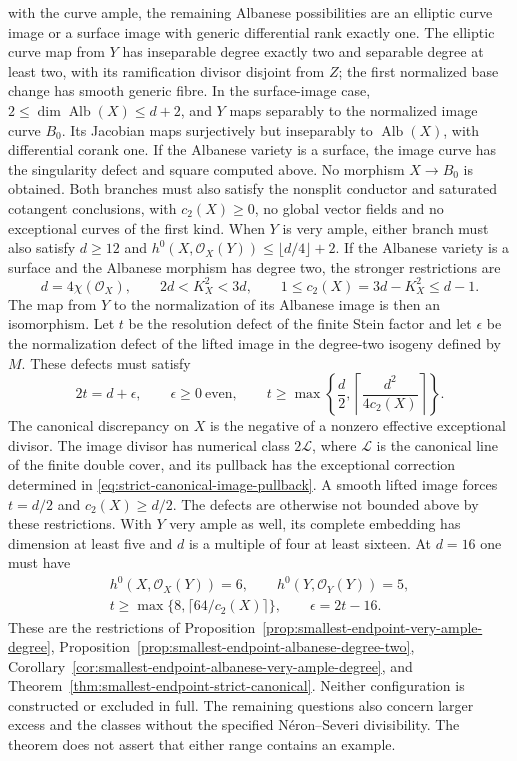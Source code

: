 \documentclass[11pt]{article}
\theoremstyle{remark}\newtheorem{remark}[theorem]{Remark}
\newcommand{\OO}{\mathcal O}
\begin{document}
with the curve ample, the remaining Albanese possibilities are an
elliptic curve image or a surface image with generic differential
rank exactly one. The elliptic curve map from $Y$ has inseparable
degree exactly two and separable degree at least two, with its
ramification divisor disjoint from $Z$; the first normalized base
change has smooth generic fibre. In the surface-image case,
$2\leq\dim\operatorname{Alb}(X)\leq d+2$, and $Y$ maps separably
to the normalized image curve $B_0$. Its Jacobian maps surjectively
but inseparably to $\operatorname{Alb}(X)$, with differential corank one.
If the Albanese variety is a surface, the image curve has the
singularity defect and square computed above. No morphism
$X\to B_0$ is obtained. Both branches must also satisfy the nonsplit
conductor and saturated cotangent conclusions, with $c_2(X)\geq0$,
no global vector fields and no exceptional curves of the first kind.
When $Y$ is very ample, either branch must also satisfy
$d\ge12$ and
$h^0(X,\OO_X(Y))\le\lfloor d/4\rfloor+2$.
If the Albanese variety is a surface and the Albanese morphism
has degree two, the stronger restrictions are
\[
 d=4\chi(\OO_X),\qquad
 2d<K_X^2<3d,\qquad
 1\le c_2(X)=3d-K_X^2\le d-1.
\]
The map from $Y$ to the normalization of its Albanese image is
then an isomorphism.
Let $t$ be the resolution defect of the finite Stein factor and
let $\epsilon$ be the normalization defect of the lifted image
in the degree-two isogeny defined by $M$.
These defects must satisfy
\[
 2t=d+\epsilon,\qquad \epsilon\ge0\ \text{even},\qquad
 t\ge\max\left\{\frac d2,
       \left\lceil\frac{d^2}{4c_2(X)}\right\rceil\right\}.
\]
The canonical discrepancy on $X$ is the negative of a nonzero
effective exceptional divisor.
The image divisor has numerical class $2\mathcal L$, where
$\mathcal L$ is the canonical line of the finite double cover,
and its pullback has the exceptional correction determined in
\eqref{eq:strict-canonical-image-pullback}.
A smooth lifted image forces $t=d/2$ and $c_2(X)\ge d/2$.
The defects are otherwise not bounded above by these restrictions.
With $Y$ very ample as well, its complete embedding has dimension
at least five and $d$ is a multiple of four at least sixteen.
At $d=16$ one must have
\[
 \begin{gathered}
 h^0(X,\OO_X(Y))=6,\qquad h^0(Y,\OO_Y(Y))=5,\\
 t\ge\max\{8,\lceil64/c_2(X)\rceil\},\qquad
 \epsilon=2t-16.
 \end{gathered}
\]
These are the restrictions of
Proposition~\ref{prop:smallest-endpoint-very-ample-degree},
Proposition~\ref{prop:smallest-endpoint-albanese-degree-two},
Corollary~\ref{cor:smallest-endpoint-albanese-very-ample-degree}, and
Theorem~\ref{thm:smallest-endpoint-strict-canonical}.
Neither configuration is constructed or excluded in full.
The remaining questions also concern larger excess and the
classes without the specified N\'eron--Severi divisibility. The theorem
does not assert that either range contains an example.
\end{document}
